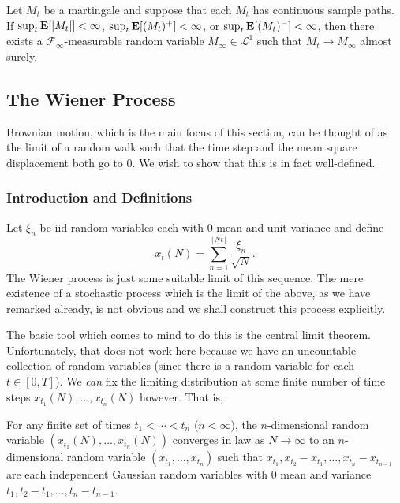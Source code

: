 		\begin{theorem}
			Let $M_t$ be a martingale and suppose that each $M_t$ has continuous sample paths. If $\sup_t\textbf{E}[|M_t|]<\infty$, $\sup_t\textbf{E}[(M_t)^+]<\infty$, or $\sup_t \textbf{E}[(M_t)^-]<\infty$, then there exists a $\mathcal{F}_\infty$-measurable random variable $M_\infty\in\mathcal{L}^1$ such that $M_t\to M_\infty$ almost surely.
		\end{theorem}

\subsection{The Wiener Process}

	Brownian motion, which is the main focus of this section, can be thought of as the limit of a random walk such that the time step and the mean square displacement both go to $0$. We wish to show that this is in fact well-defined.

	\subsubsection{Introduction and Definitions}

	Let $\xi_n$ be iid random variables each with $0$ mean and unit variance and define
	\begin{equation}
		\label{eqn: donsker wiener}
		x_t(N) = \sum_{n=1}^{\lfloor Nt\rfloor} \frac{\xi_n}{\sqrt{N}}.
	\end{equation}
	The Wiener process is just some suitable limit of this sequence. The mere existence of a stochastic process which is the limit of the above, as we have remarked already, is not obvious and we shall construct this process explicitly.

	The basic tool which comes to mind to do this is the central limit theorem. Unfortunately, that does not work here because we have an uncountable collection of random variables (since there is a random variable for each $t\in[0,T]$). We \textit{can} fix the limiting distribution at some finite number of time steps $x_{t_1}(N),\ldots,x_{t_n}(N)$ however. That is,

	\begin{lemma}
		\label{finite wiener}
		For any finite set of times $t_1<\cdots<t_n$ ($n<\infty$), the $n$-dimensional random variable $(x_{t_1}(N),\ldots,x_{t_n}(N))$ converges in law as $N\to\infty$ to an $n$-dimensional random variable $(x_{t_1},\ldots,x_{t_n})$ such that $x_{t_1}, x_{t_2}-x_{t_1},\ldots,x_{t_n}-x_{t_{n-1}}$ are each independent Gaussian random variables with $0$ mean and variance $t_1,t_2-t_1,\ldots,t_{n}-t_{n-1}$.
	\end{lemma}

